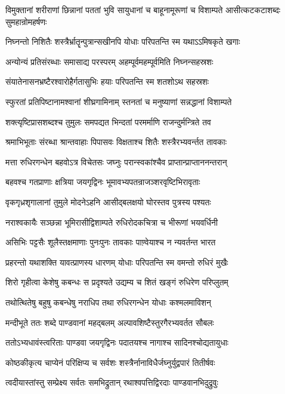\threelineshloka
{विमुक्तानां शरीराणां छिन्नानां पततां भुवि}
{सायुधानां च बाहूनामूरूणां च विशाम्पते}
{आसीत्कटकटाशब्दः सुमहान्रोमहर्षणः}


\twolineshloka
{निघ्नन्तो निशितैः शस्त्रैर्भ्रातॄन्पुत्रान्सखीनपि}
{योधाः परिपतन्ति स्म यथाऽऽमिषकृते खगाः}


\twolineshloka
{अन्योन्यं प्रतिसंरब्धाः समासाद्य परस्परम्}
{अहम्पूर्वमहम्पूर्वमिति निघ्नन्सहस्रशः}


\twolineshloka
{संयातेनासनभ्रष्टैरश्वारोहैर्गतासुभिः}
{हयाः परिपतन्ति स्म शतशोऽथ सहस्रशः}


\twolineshloka
{स्फुरतां प्रतिपिष्टानामश्वानां शीघ्रगामिनाम्}
{स्तनतां च मनुष्याणां सन्नद्धानां विशाम्पते}


\twolineshloka
{शक्त्यृष्टिप्रासशब्दश्च तुमुलः समपद्यत}
{भिन्दतां परमर्माणि राजन्दुर्मन्त्रिते तव}


\twolineshloka
{श्रमाभिभूताः संरब्धा श्रान्तवाहाः पिपासवः}
{विक्षताश्च शितैः शस्त्रैरभ्यवर्न्तत तावकाः}


\twolineshloka
{मत्ता रुधिरगन्धेन बहवोऽत्र विचेतसः}
{जघ्नुः परान्स्वकांश्चैव प्राप्तान्प्राप्ताननन्तरान्}


\twolineshloka
{बहवश्च गतप्राणाः क्षत्रिया जयगृद्विनः}
{भूमावभ्यपतन्राजञ्शरवृष्टिभिरावृताः}


\twolineshloka
{वृकगृध्रशृगालानां तुमुले मोदनेऽहनि}
{आसीद्बलक्षयो घोरस्तव पुत्रस्य पश्यतः}


\twolineshloka
{नराश्वकायैः सञ्छन्ना भूमिरासीद्विशाम्पते}
{रुधिरोदकचित्रा च भीरूणां भयवर्धिनी}


\twolineshloka
{असिभिः पट्टसैः शूलैस्तक्षमाणाः पुनःपुनः}
{तावकाः पाण़्वेयाश्च न न्यवर्तन्त भारत}


\twolineshloka
{प्रहरन्तो यथाशक्ति यावत्प्राणस्य धारणम्}
{योधाः परिपतन्ति स्म वमन्तो रुधिरं मुखैः}


\twolineshloka
{शिरो गृहीत्वा केशेषु कबन्धः स प्रदृश्यते}
{उद्यम्य च शितं खङ्गं रुधिरेण परिप्लुतम्}


\twolineshloka
{तथोत्थितेषु बहुषु कबन्धेषु नराधिप}
{तथा रुधिरगन्धेन योधाः कश्मलमाविशन्}


\twolineshloka
{मन्दीभूते ततः शब्दे पाण्डवानां महद्बलम्}
{अल्पावशिष्टैस्तुरगैरभ्यवर्तत सौबलः}


\twolineshloka
{ततोऽभ्यधावंस्त्वरिताः पाण्डवा जयगृद्विनः}
{पदातयश्च नागाश्च सादिनश्चोद्यतायुधाः}


\twolineshloka
{कोष्ठकीकृत्य चाप्येनं परिक्षिप्य च सर्वशः}
{शस्त्रैर्नानाविधैर्जघ्नुर्युद्वपारं तितीर्षवः}


\twolineshloka
{त्वदीयास्तांस्तु सम्प्रेक्ष्य सर्वतः समभिद्रुतान्}
{रथाश्वपत्तिद्विरदाः पाण्डवानभिदुद्रुवुः}


